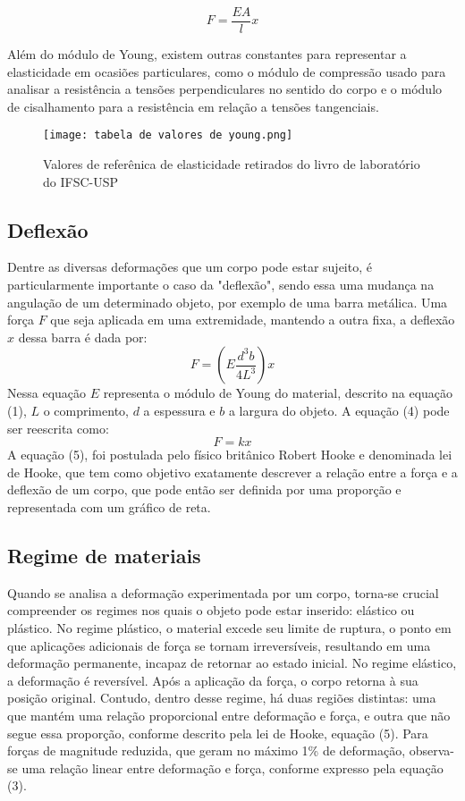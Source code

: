 \documentclass{article}
\begin{document}
\begin{equation}
    F= \frac{EA}{l}x
\end{equation}

Além do módulo de Young, existem outras constantes para representar a elasticidade em ocasiões particulares, como o módulo de compressão usado para analisar a resistência a tensões perpendiculares no sentido do corpo e o módulo de cisalhamento para a resistência em relação a tensões tangenciais.     

    \begin{figure}[!h]
        \centering
        \caption{Valores de referênica de elasticidade retirados do livro de laboratório do     IFSC-USP}
        \texttt{[image: tabela de valores de young.png]}
  
    \end{figure}

\subsection{Deflexão}

Dentre as diversas deformações que um corpo pode estar sujeito, é particularmente importante o caso da "deflexão", sendo essa uma mudança na angulação de um determinado objeto, por exemplo de uma barra metálica. Uma força $F$ que seja aplicada em uma extremidade, mantendo a outra fixa, a deflexão $x$ dessa barra é dada por:
\begin{equation}
    F = \left(E\frac{d^3b}{4L^3}\right)x
\end{equation}
Nessa equação $E$ representa o módulo de Young do material, descrito na equação (1), $L$ o comprimento, $d$ a espessura e $b$ a largura do objeto. 
A equação (4) pode ser reescrita como:
\begin{equation}
    F = kx
\end{equation}
A equação (5), foi postulada pelo físico britânico Robert Hooke e denominada lei de Hooke, que tem como objetivo exatamente descrever a relação entre a força e a deflexão de um corpo, que pode então ser definida por uma proporção e representada com um gráfico de reta. 

\subsection{Regime de materiais} 

Quando se analisa a deformação experimentada por um corpo, torna-se crucial compreender os regimes nos quais o objeto pode estar inserido: elástico ou plástico.
No regime plástico, o material excede seu limite de ruptura, o ponto em que aplicações adicionais de força se tornam irreversíveis, resultando em uma deformação permanente, incapaz de retornar ao estado inicial.
No regime elástico, a deformação é reversível. Após a aplicação da força, o corpo retorna à sua posição original. Contudo, dentro desse regime, há duas regiões distintas: uma que mantém uma relação proporcional entre deformação e força, e outra que não segue essa proporção, conforme descrito pela lei de Hooke, equação (5). Para forças de magnitude reduzida, que geram no máximo 1\% de deformação, observa-se uma relação linear entre deformação e força, conforme expresso pela equação (3).
\end{document}
